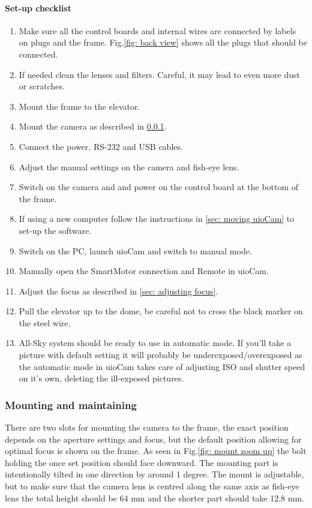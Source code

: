\documentclass[]{book}
\begin{document}
	\paragraph{Set-up checklist}
	\begin{enumerate}
		\item Make sure all the control boards and internal wires are connected by labels on plugs and the frame. Fig.\ref{fig: back view} shows all the plugs that should be connected.
		\item If needed clean the lenses and filters. Careful, it may lead to even more dust or scratches.
		\item Mount the frame to the elevator.
		\item Mount the camera as described in \ref{sec: Mounting}.
		\item Connect the power, RS-232 and USB cables.
		\item Adjust the manual settings on the camera and fish-eye lens.
		\item Switch on the camera and and power on the control board at the bottom of the frame.
		\item If using a new computer follow the instructions in \ref{sec: moving uioCam} to set-up the software.
		\item Switch on the PC, launch uioCam and switch to manual mode.
		\item Manually open the SmartMotor connection and Remote in uioCam.
		\item Adjust the focus as described in \ref{sec: adjusting focus}.
		\item Pull the elevator up to the dome, be careful not to cross the black marker on the steel wire.
		\item All-Sky system should be ready to use in automatic mode. If you'll take a picture with default setting it will probably be underexposed/overexposed as the automatic mode in uioCam takes care of adjusting ISO and shutter speed on it's own, deleting the ill-exposed pictures.
	\end{enumerate}

	\subsubsection{Mounting and maintaining} \label{sec: Mounting}
	There are two slots for mounting the camera to the frame, the exact position depends on the aperture settings and focus, but the default position allowing for optimal focus is shown on the frame. As seen in Fig.\ref{fig: mount zoom up} the bolt holding the once set position should face downward. The mounting part is intentionally tilted in one direction by around 1 degree. The mount is adjustable, but to make sure that the camera lens is centred along the same axis as fish-eye lens the total height should be 64 mm and the shorter part should take 12.8 mm.
		
\end{document}
